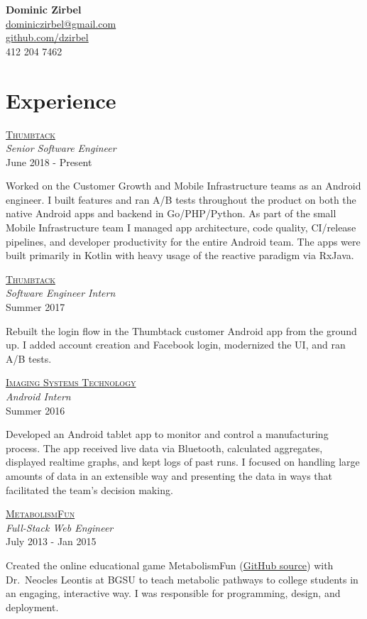 \documentclass[letterpaper,10pt]{article}
\newenvironment{resumecols}[4]
{
    \vspace{.1cm}
    \begin{minipage}[t]{.21\linewidth}
        \begin{flushright}
            \href{#2}{\textsc{#1}} \\
            \small{\textit{#3}} \\
            \small{#4}
        \end{flushright}
    \end{minipage}
    \hspace{.005\linewidth}
    \begin{minipage}[t]{.77\linewidth}
}
{
    \end{minipage}
    \vspace{.1cm}
}
\begin{document}
\thispagestyle{empty}

\begin{flushright}
    \textbf{\Large{Dominic Zirbel}} \\
    \href{mailto:dominiczirbel@gmail.com}{dominiczirbel@gmail.com} \\
    \href{https://github.com/dzirbel}{github.com/dzirbel} \\
    412 204 7462
\end{flushright}

\section{Experience}

\begin{resumecols}{Thumbtack}{https://www.thumbtack.com/about}{Senior Software Engineer}{June 2018 - Present}
    Worked on the Customer Growth and Mobile Infrastructure teams as an Android engineer. I built features and ran A/B tests throughout the product on both the native Android apps and backend in Go/PHP/Python. As part of the small Mobile Infrastructure team I managed app architecture, code quality, CI/release pipelines, and developer productivity for the entire Android team. The apps were built primarily in Kotlin with heavy usage of the reactive paradigm via RxJava.
\end{resumecols}

\begin{resumecols}{Thumbtack}{https://www.thumbtack.com/about}{Software Engineer Intern}{Summer 2017}
    Rebuilt the login flow in the Thumbtack customer Android app from the ground up. I added account creation and Facebook login, modernized the UI, and ran A/B tests.
\end{resumecols}

\begin{resumecols}{Imaging Systems Technology}{http://www.teamist.com}{Android Intern}{Summer 2016}
    Developed an Android tablet app to monitor and control a manufacturing process. The app received live data via Bluetooth, calculated aggregates, displayed realtime graphs, and kept logs of past runs. I focused on handling large amounts of data in an extensible way and presenting the data in ways that facilitated the team's decision making.
\end{resumecols}

\begin{resumecols}{MetabolismFun}{https://github.com/dzirbel/metabolism-fun}{Full-Stack Web Engineer}{July 2013 - Jan 2015}
    Created the online educational game MetabolismFun (\href{https://github.com/dzirbel/metabolism-fun}{\underline{GitHub source}}) with Dr.\ Neocles Leontis at BGSU to teach metabolic pathways to college students in an engaging, interactive way. I was responsible for programming, design, and deployment.
\end{resumecols}
\end{document}
